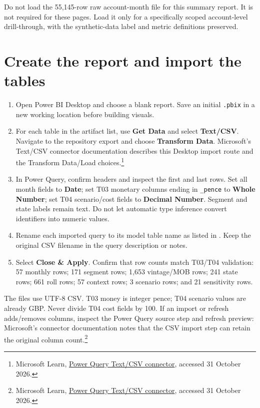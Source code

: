 \documentclass[11pt]{article}
\begin{document}
Do not load the 55,145-row raw account-month file for this summary report. It is not required for these pages. Load it only for a specifically scoped account-level drill-through, with the synthetic-data label and metric definitions preserved.

\section{Create the report and import the tables}

\begin{enumerate}
\item Open Power BI Desktop and choose a blank report. Save an initial \texttt{.pbix} in a new working location before building visuals.
\item For each table in the artifact list, use \textbf{Get Data} and select \textbf{Text/CSV}. Navigate to the repository export and choose \textbf{Transform Data}. Microsoft's Text/CSV connector documentation describes this Desktop import route and the Transform Data/Load choices.\footnote{Microsoft Learn, \href{https://learn.microsoft.com/en-us/power-query/connectors/text-csv}{Power Query Text/CSV connector}, accessed 31 October 2026.}
\item In Power Query, confirm headers and inspect the first and last rows. Set all month fields to \textbf{Date}; set T03 monetary columns ending in \texttt{\_pence} to \textbf{Whole Number}; set T04 scenario/cost fields to \textbf{Decimal Number}. Segment and state labels remain text. Do not let automatic type inference convert identifiers into numeric values.
\item Rename each imported query to its model table name as listed in . Keep the original CSV filename in the query description or notes.
\item Select \textbf{Close \& Apply}. Confirm that row counts match T03/T04 validation: 57 monthly rows; 171 segment rows; 1,653 vintage/MOB rows; 241 state rows; 661 roll rows; 57 context rows; 3 scenario rows; and 21 sensitivity rows.
\end{enumerate}

The files use UTF-8 CSV. T03 money is integer pence; T04 scenario values are already GBP. Never divide T04 cost fields by 100. If an import or refresh adds/removes columns, inspect the Power Query source step and refresh preview: Microsoft's connector documentation notes that the CSV import step can retain the original column count.\footnote{Microsoft Learn, \href{https://learn.microsoft.com/en-us/power-query/connectors/text-csv}{Power Query Text/CSV connector}, accessed 31 October 2026.}
\end{document}
